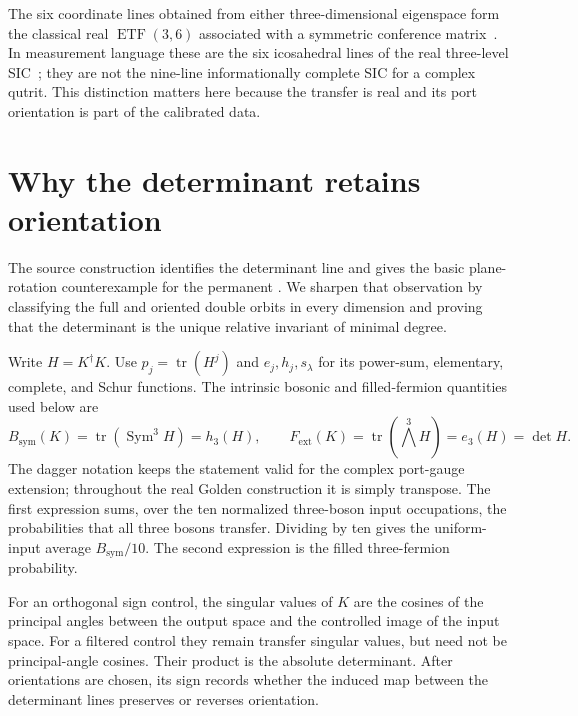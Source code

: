 \documentclass[11pt]{article}
\theoremstyle{remark}
\newcommand{\Sym}{\operatorname{Sym}}
\begin{document}
The six coordinate lines obtained from either three-dimensional eigenspace
form the classical real \(\operatorname{ETF}(3,6)\) associated with a symmetric
conference matrix~\cite{FickusMixon}.  In measurement language these are the
six icosahedral lines of the real three-level SIC~\cite{BengtssonZyczkowski};
they are not the nine-line informationally complete SIC for a complex qutrit.
This distinction matters here because the transfer is real and its port
orientation is part of the calibrated data.

\section{Why the determinant retains orientation}

The source construction identifies the determinant line and gives the basic
plane-rotation counterexample for the permanent
\cite[Section~5]{ClebschIII}.  We sharpen that observation by classifying the
full and oriented double orbits in every dimension and proving that the
determinant is the unique relative invariant of minimal degree.

Write \(H=K^\dagger K\).  Use \(p_j=\operatorname{tr}(H^j)\) and
\(e_j,h_j,s_\lambda\) for its power-sum, elementary, complete, and Schur
functions.  The intrinsic bosonic and filled-fermion quantities used below are
\[
 B_{\mathrm{sym}}(K)=\operatorname{tr}(\Sym^3 H)=h_3(H),
 \qquad
 F_{\mathrm{ext}}(K)=\operatorname{tr}(\bigwedge^3 H)
 =e_3(H)=\det H.
\]
The dagger notation keeps the statement valid for the complex port-gauge
extension; throughout the real Golden construction it is simply transpose.
The first expression sums, over the ten normalized three-boson input
occupations, the probabilities that all three bosons transfer.  Dividing by
ten gives the uniform-input average \(B_{\mathrm{sym}}/10\).  The second
expression is the filled three-fermion probability.

For an orthogonal sign control, the singular values of \(K\) are the cosines
of the principal angles between the output space and the controlled image of
the input space.  For a filtered control they remain transfer singular values,
but need not be principal-angle cosines.  Their product is the absolute
determinant.  After orientations are chosen, its sign records whether the
induced map between the determinant lines preserves or reverses orientation.
\end{document}
